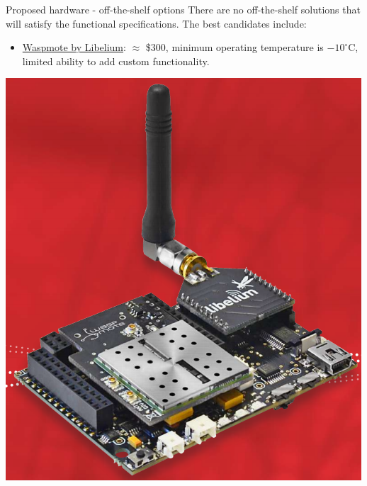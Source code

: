 \documentclass{beamer}
\newcommand{\myhref}[2]{{\color{blue}\href{#1}{#2}}}
\begin{document}
    \begin{frame}{Proposed hardware - off-the-shelf options}
        There are no off-the-shelf solutions that will satisfy the functional specifications. The best candidates include: \\
        \vspace*{0.25cm}
        \begin{minipage}{0.48\linewidth}
        \begin{itemize}
            \item \myhref{http://www.libelium.com/development/waspmote}{Waspmote by Libelium}: $\approx$ \$300, minimum operating temperature is $-10^{\circ}$C, limited ability to add custom functionality. 
        \end{itemize}
        \end{minipage}
        \begin{minipage}{0.48\linewidth}
            \begin{center}
                \includegraphics[scale=0.2]{figures/wasp.PNG}
            \end{center}
        \end{minipage} \\ \vspace*{0.5cm} \hline \vspace*{0.5cm}

\end{frame}
\end{document}

